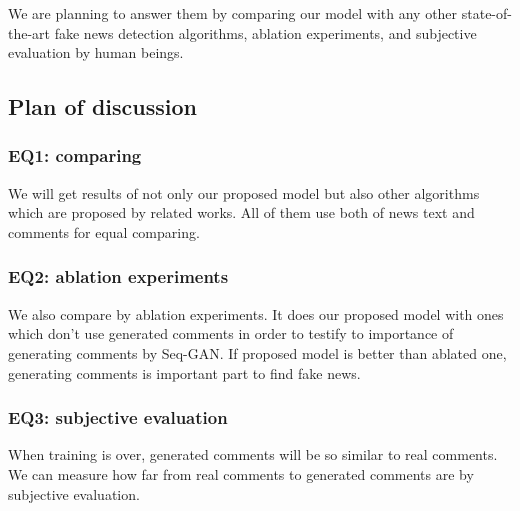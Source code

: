 We are planning to answer them by comparing our model with any other state-of-the-art fake news detection algorithms,
ablation experiments, and subjective evaluation by human beings.

\subsection{Plan of discussion}
\subsubsection{EQ1: comparing}
We will get results of not only our proposed model but also other algorithms which are proposed by related works.
All of them use both of news text and comments for equal comparing.
\subsubsection{EQ2: ablation experiments}
We also compare by ablation experiments.
It does our proposed model with ones which don't use generated comments in order to
testify to importance of generating comments by Seq-GAN.
If proposed model is better than ablated one, generating comments is important part to find fake news.
\subsubsection{EQ3: subjective evaluation}
When training is over, generated comments will be so similar to real comments.
We can measure how far from real comments to generated comments are by subjective evaluation.